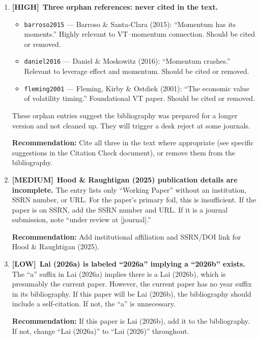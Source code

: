 \documentclass[12pt,a4paper]{article}
\newcommand{\HIGH}{\textcolor{highsev}{\textbf{[HIGH]}}}
\newcommand{\MEDIUM}{\textcolor{medsev}{\textbf{[MEDIUM]}}}
\newcommand{\LOW}{\textcolor{lowsev}{\textbf{[LOW]}}}
\begin{document}
\begin{enumerate}[label=\textbf{10.\arabic*}]

\item \HIGH\ \textbf{Three orphan references: never cited in the text.}
\begin{itemize}
\item \texttt{barroso2015} --- Barroso \& Santa-Clara (2015): ``Momentum has its moments.'' Highly relevant to VT--momentum connection. Should be cited or removed.
\item \texttt{daniel2016} --- Daniel \& Moskowitz (2016): ``Momentum crashes.'' Relevant to leverage effect and momentum. Should be cited or removed.
\item \texttt{fleming2001} --- Fleming, Kirby \& Ostdiek (2001): ``The economic value of volatility timing.'' Foundational VT paper. Should be cited or removed.
\end{itemize}
These orphan entries suggest the bibliography was prepared for a longer version and not cleaned up. They will trigger a desk reject at some journals.

\textbf{Recommendation:} Cite all three in the text where appropriate (see specific suggestions in the Citation Check document), or remove them from the bibliography.

\item \MEDIUM\ \textbf{Hood \& Raughtigan (2025) publication details are incomplete.}
The entry lists only ``Working Paper'' without an institution, SSRN number, or URL. For the paper's primary foil, this is insufficient. If the paper is on SSRN, add the SSRN number and URL. If it is a journal submission, note ``under review at [journal].''

\textbf{Recommendation:} Add institutional affiliation and SSRN/DOI link for Hood \& Raughtigan (2025).

\item \LOW\ \textbf{Lai (2026a) is labeled ``2026a'' implying a ``2026b'' exists.}
The ``a'' suffix in Lai (2026a) implies there is a Lai (2026b), which is presumably the current paper. However, the current paper has no year suffix in its bibliography. If this paper will be Lai (2026b), the bibliography should include a self-citation. If not, the ``a'' is unnecessary.

\textbf{Recommendation:} If this paper is Lai (2026b), add it to the bibliography. If not, change ``Lai (2026a)'' to ``Lai (2026)'' throughout.

\end{enumerate}
\end{document}
